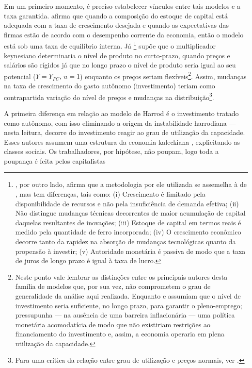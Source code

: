Em um primeiro momento, é preciso estabelecer vínculos entre tais modelos e a taxa garantida. \textcite{robinson_model_1962} afirma que quando a composição do estoque de capital está adequada com a taxa de crescimento desejada e quando as expectativas das firmas estão de acordo com o desempenho corrente da economia, então o modelo está sob uma taxa de equilíbrio interna. Já \textcite{kaldor_alternative_1955}\footnote{
	\textcite{kaldor_model_1957}, por outro lado, afirma que a metodologia por ele utilizada se assemelha à de \textcite{harrod_essay_1939}, mas tem diferenças, tais como: (i) Crescimento é limitado pela disponibilidade de recursos e não pela insuficiência de demanda efetiva; (ii) Não distingue mudanças técnicas decorrentes de maior acumulação de capital daquelas resultantes de inovações; (iii) Estoque de capital em termos reais é medido pela quantidade de ferro incorporada; (iv) O crescimento econômico decorre tanto da rapidez na absorção de mudanças tecnológicas quanto da propensão à investir; (v) Autoridade monetária é passiva de modo que a taxa de juros de longo prazo é igual à taxa de lucro.
} supõe que o multiplicador keynesiano determinaria o nível de produto no curto-prazo, quando preços e salários são rígidos já que no longo prazo o nível de produto seria igual ao seu potencial ($Y = Y_{FC}, \,u=1$) enquanto os preços seriam flexíveis\footnote{
	Neste ponto vale lembrar as distinções entre os principais autores desta família de modelos que, por sua vez, não comprometem o grau de generalidade da análise aqui realizada. Enquanto \textcite[5--6]{kaldor_alternative_1955} e \textcite{pasinetti_rate_1962} assumiam que o nível de investimento seria suficiente, no longo prazo, para garantir o pleno-emprego; \textcite{robinson_model_1962} pressupunha --- na ausência de uma barreira inflacionária --- uma política monetária acomodatícia de modo que não existiriam restrições ao financiamento do investimento e, assim, a economia operaria em plena utilização da capacidade.
}. Assim, mudanças na taxa de crescimento do gasto autônomo (investimento) teriam como contrapartida variação do nível de preços e mudanças na distribuição\footnote{Para uma crítica da relação entre grau de utilização e preços normais, ver \textcite{ciccone_2017}.}. 

A primeira diferença em relação ao modelo de Harrod é o investimento tratado como autônomo, com isso eliminando a origem da instabilidade harrodiana --- nesta leitura, decorre do investimento reagir ao grau de utilização da capacidade. Esses autores assumem uma estrutura da economia kaleckiana \cite{kalecki_theory_1954}, explicitando as classes sociais. Os trabalhadores, por hipótese, não poupam, logo toda a poupança é feita pelos capitalistas

